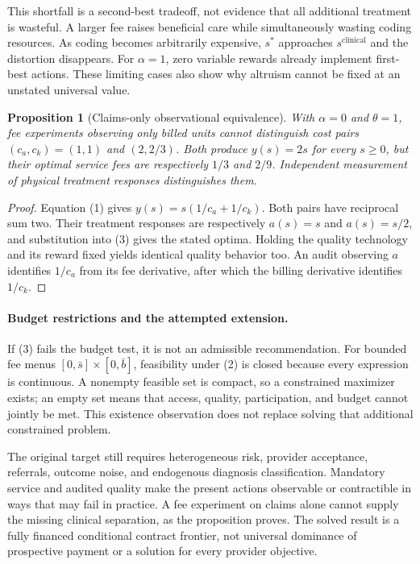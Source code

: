 \documentclass[11pt]{article}
\newtheorem{proposition}[theorem]{Proposition}
\theoremstyle{definition}
\begin{document}
This shortfall is a second-best tradeoff, not evidence that all additional treatment is wasteful. A larger fee raises beneficial care while simultaneously wasting coding resources. As coding becomes arbitrarily expensive, $s^*$ approaches $s^{\mathrm{clinical}}$ and the distortion disappears. For $\alpha=1$, zero variable rewards already implement first-best actions. These limiting cases also show why altruism cannot be fixed at an unstated universal value.

\begin{proposition}[Claims-only observational equivalence]
With $\alpha=0$ and $\theta=1$, fee experiments observing only billed units cannot distinguish cost pairs $(c_a,c_k)=(1,1)$ and $(2,2/3)$. Both produce $y(s)=2s$ for every $s\geq0$, but their optimal service fees are respectively $1/3$ and $2/9$. Independent measurement of physical treatment responses distinguishes them.
\end{proposition}
\begin{proof}
Equation (1) gives $y(s)=s(1/c_a+1/c_k)$. Both pairs have reciprocal sum two. Their treatment responses are respectively $a(s)=s$ and $a(s)=s/2$, and substitution into (3) gives the stated optima. Holding the quality technology and its reward fixed yields identical quality behavior too. An audit observing $a$ identifies $1/c_a$ from its fee derivative, after which the billing derivative identifies $1/c_k$.
\end{proof}

\paragraph{Budget restrictions and the attempted extension.}
If (3) fails the budget test, it is not an admissible recommendation. For bounded fee menus $[0,\bar s]\times[0,\bar b]$, feasibility under (2) is closed because every expression is continuous. A nonempty feasible set is compact, so a constrained maximizer exists; an empty set means that access, quality, participation, and budget cannot jointly be met. This existence observation does not replace solving that additional constrained problem.

The original target still requires heterogeneous risk, provider acceptance, referrals, outcome noise, and endogenous diagnosis classification. Mandatory service and audited quality make the present actions observable or contractible in ways that may fail in practice. A fee experiment on claims alone cannot supply the missing clinical separation, as the proposition proves. The solved result is a fully financed conditional contract frontier, not universal dominance of prospective payment or a solution for every provider objective.
\end{document}
